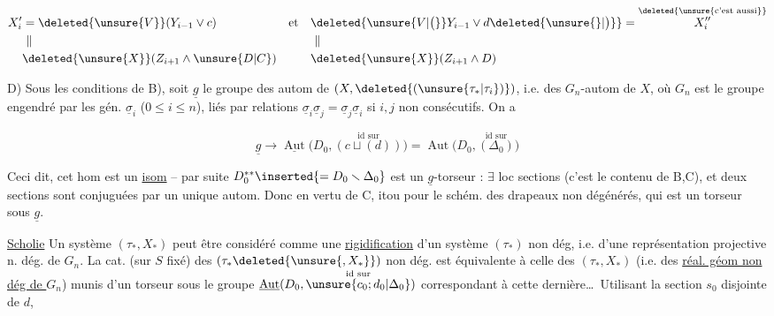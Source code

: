 \[
\begin{aligned}
X'_i&=\deleted{\unsure{V}}(Y_{i-1}\vee c) &\text{et}\quad &\deleted{\unsure{V|\bigl(}}Y_{i-1}\vee d\deleted{\unsure{\}|\bigr)}}=\overset{\deleted{\unsure{\text{c'est aussi}}}}{X''_i}\\
&\ \Vert &&\ \Vert\\
&\deleted{\unsure{X}}(Z_{i+1}\wedge \unsure{D|C}) && \deleted{\unsure{X}}(Z_{i+1}\wedge D)
\end{aligned}
\]



D) Sous les conditions de B), soit  $\underline g$ le groupe des autom de $(X,\deleted{(\unsure{\tau_*|\tau_i})})$, i.e. des $G_n$-autom de $X$, où $G_n$ est le groupe engendré par les gén. $\underline\sigma_i$ ($0\leq i\leq n$), liés par relations $\underline\sigma_i\underline\sigma_j=\underline\sigma_j\underline\sigma_i$ si $i,j$ non consécutifs. On a 

\[
\underline g\longrightarrow\underline{\operatorname{Aut}}\bigl(D_0,\overset{\text{id sur}}{(c\sqcup(d))}\bigr)
=\operatorname{Aut}\bigl(D_0,\overset{\text{id sur}}{(\Delta_0)}\bigr)
\]




Ceci dit, cet hom est un \uline{isom} -- par suite $D_0^{**}\inserted{=D_0\smallsetminus\Delta_0}$ est un $\underline g$-torseur : $\exists$ loc sections (c'est le contenu de B,C), et deux sections sont conjuguées par un unique autom. Donc  en vertu de C, itou pour le schém. des \inserted{$(\tau_*)$-}drapeaux non dégénérés, qui est un torseur sous $\underline g$.

\uline{Scholie} Un système $(\tau_*,X_*)$  peut être considéré comme une \uline{rigidification} d'un système $(\tau_*)$ non dég, i.e. d'une représentation projective n. dég. de $G_n$. La cat. (sur $S$ fixé) des $(\tau_*\deleted{\unsure{,X_*}})$ non dég. est équivalente à celle des $(\tau_*,X_*)$ (i.e. des \uline{réal. géom non dég de $G_n$}) munis d'un torseur sous le groupe  $\underline{\operatorname{Aut}}(D_0,\overset{\text{id sur}}{\unsure{c_0;d_0|\Delta_0}})$ correspondant à cette dernière\ldots\ Utilisant la section $s_0$ disjointe de $d$,  

